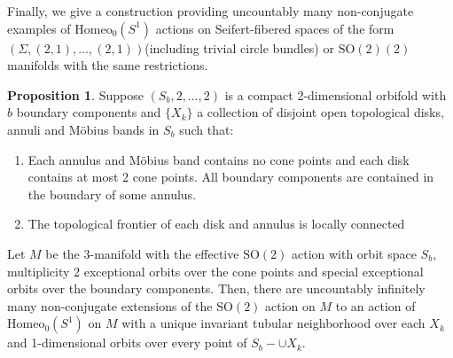 \documentclass[10pt, oneside]{article}
\newcommand{\SO}[1][2]{\text{SO}(#1)}
\newcommand{\homeo}[1][S^1]{\text{Homeo}_0(#1)}
\theoremstyle{definition}
\newtheorem{conj}{Conjecture}[section]
\newtheorem{prop}{Proposition}[section]
\theoremstyle{definition}
\begin{document}
Finally, we give a construction providing uncountably many non-conjugate examples of $\homeo$ actions on Seifert-fibered spaces of the form $(\Sigma, (2, 1), \dots, (2, 1))$(including trivial circle bundles) or $\SO(2)$ manifolds with the same restrictions.


\begin{prop}\label{prop:lc-fr-construction}
    Suppose $(S_b, 2, \dots, 2)$ is a compact 2-dimensional orbifold with $b$ boundary  components and $\{X_k\}$ a collection of disjoint open topological disks, annuli and  M\"{o}bius bands in $S_b$ such that:
    \begin{enumerate}
        \item Each annulus and M\"{o}bius band contains no cone points and each disk contains at most 2 cone points. All boundary components are contained in the boundary of some annulus.
        \item The topological frontier of each disk and annulus is locally connected
    \end{enumerate}
    Let $M$ be the 3-manifold with the effective $\SO$ action with orbit space $S_b$, multiplicity 2 exceptional orbits over the cone points and special exceptional orbits over the boundary components. Then, there are uncountably infinitely many non-conjugate extensions of the $\SO$ action on $M$ to an action of $\homeo$ on $M$ with a unique invariant tubular neighborhood over each $X_k$ and 1-dimensional orbits over every point of $S_b - \cup X_k$.
\end{prop}
\end{document}
